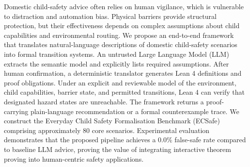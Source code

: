 Domestic child-safety advice often relies on human vigilance, which is vulnerable to distraction and automation bias. Physical barriers provide structural protection, but their effectiveness depends on complex assumptions about child capabilities and environmental routing. We propose an end-to-end framework that translates natural-language descriptions of domestic child-safety scenarios into formal transition systems. An untrusted Large Language Model (LLM) extracts the semantic model and explicitly lists required assumptions. After human confirmation, a deterministic translator generates Lean 4 definitions and proof obligations. Under an explicit and reviewable model of the environment, child capabilities, barrier state, and permitted transitions, Lean 4 can verify that designated hazard states are unreachable. The framework returns a proof-carrying plain-language recommendation or a formal counterexample trace. We construct the Everyday Child Safety Formalisation Benchmark (ECSafe) comprising approximately 80 core scenarios. Experimental evaluation demonstrates that the proposed pipeline achieves a 0.0\% false-safe rate compared to baseline LLM advice, proving the value of integrating interactive theorem proving into human-centric safety applications.
